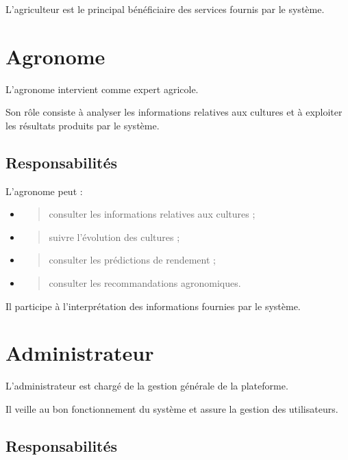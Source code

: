 L'agriculteur est le principal bénéficiaire des services fournis par le
système.

\hypertarget{agronome}{%
\section{Agronome}\label{agronome}}

L'agronome intervient comme expert agricole.

Son rôle consiste à analyser les informations relatives aux cultures et
à exploiter les résultats produits par le système.

\hypertarget{responsabilituxe9s-1}{%
\subsection{Responsabilités}\label{responsabilituxe9s-1}}

L'agronome peut :

\begin{itemize}
\item
  \begin{quote}
  consulter les informations relatives aux cultures ;
  \end{quote}
\item
  \begin{quote}
  suivre l'évolution des cultures ;
  \end{quote}
\item
  \begin{quote}
  consulter les prédictions de rendement ;
  \end{quote}
\item
  \begin{quote}
  consulter les recommandations agronomiques.
  \end{quote}
\end{itemize}

Il participe à l'interprétation des informations fournies par le
système.

\hypertarget{administrateur}{%
\section{Administrateur}\label{administrateur}}

L'administrateur est chargé de la gestion générale de la plateforme.

Il veille au bon fonctionnement du système et assure la gestion des
utilisateurs.

\hypertarget{responsabilituxe9s-2}{%
\subsection{Responsabilités}\label{responsabilituxe9s-2}}

